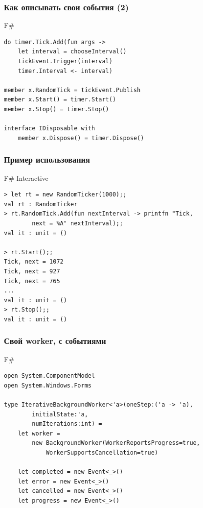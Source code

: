 \documentclass[xetex,mathserif,serif]{beamer}
\begin{document}
    \begin{frame}[fragile]
        \frametitle{Как описывать свои события (2)}
        \begin{exampleblock}{F\#}
            \begin{lstlisting}
do timer.Tick.Add(fun args ->
    let interval = chooseInterval()
    tickEvent.Trigger(interval)
    timer.Interval <- interval)

member x.RandomTick = tickEvent.Publish
member x.Start() = timer.Start()
member x.Stop() = timer.Stop()

interface IDisposable with
    member x.Dispose() = timer.Dispose()
\end{lstlisting}
\end{exampleblock}
\end{frame}

    \begin{frame}[fragile]
        \frametitle{Пример использования}
        \begin{alertblock}{F\# Interactive}
            \begin{lstlisting}[keywordstyle=\color{black},emphstyle=\color{black}]
> let rt = new RandomTicker(1000);;
val rt : RandomTicker
> rt.RandomTick.Add(fun nextInterval -> printfn "Tick, 
        next = %A" nextInterval);;
val it : unit = ()

> rt.Start();;
Tick, next = 1072
Tick, next = 927
Tick, next = 765
...
val it : unit = ()
> rt.Stop();;
val it : unit = ()
\end{lstlisting}
\end{alertblock}
\end{frame}

    \begin{frame}[fragile]
        \frametitle{Свой worker, с событиями}
        \begin{exampleblock}{F\#}
            \begin{lstlisting}
open System.ComponentModel
open System.Windows.Forms

type IterativeBackgroundWorker<'a>(oneStep:('a -> 'a),
        initialState:'a,
        numIterations:int) =
    let worker =
        new BackgroundWorker(WorkerReportsProgress=true,
            WorkerSupportsCancellation=true)

    let completed = new Event<_>()
    let error = new Event<_>()
    let cancelled = new Event<_>()
    let progress = new Event<_>()
\end{lstlisting}
\end{exampleblock}
\end{frame}
\end{document}
